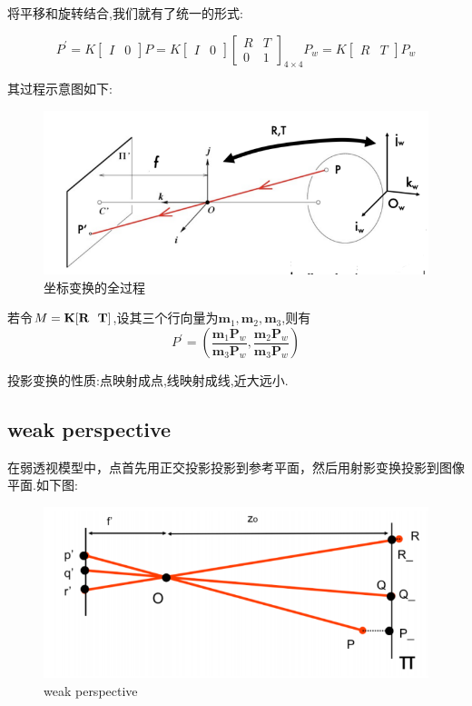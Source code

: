 将平移和旋转结合,我们就有了统一的形式:

\begin{equation}
	P^{\prime}=K\left[\begin{array}{ll}
		I & 0
	\end{array}\right] P=K\left[\begin{array}{ll}
		I & 0
	\end{array}\right]\left[\begin{array}{ll}
		R & T \\
		0 & 1
	\end{array}\right]_{4 \times 4} P_{w}=K\left[\begin{array}{ll}
		R & T
	\end{array}\right] P_{w}
\end{equation}

其过程示意图如下:

\begin{figure}[htbp]
	\centering
	\includegraphics[scale=0.75]{figures/transform_all.png}
	\caption{坐标变换的全过程}
\end{figure}

若令$M = \bold{K}[\bold{R} \ \ \bold{T}]$,设其三个行向量为$\bm m_1, \bm m_2, \bm m_3$,则有
\begin{equation}
	P^\prime = \left(\frac{\bm{m}_{1} \bm P_{w}}{\bm{m}_{3} \bm P_{w}}, \frac{\bm{m}_{2} \bm P_{w}}{\bm{m}_{3} \bm P_{w}}\right)
\end{equation}

投影变换的性质:点映射成点,线映射成线,近大远小.

\subsection{weak perspective}

在弱透视模型中，点首先用正交投影投影到参考平面，然后用射影变换投影到图像平面.如下图:

\begin{figure}[htbp]
	\centering
	\includegraphics[scale=0.8]{figures/weak_perspective.png}
	\caption{weak perspective}
\end{figure}

